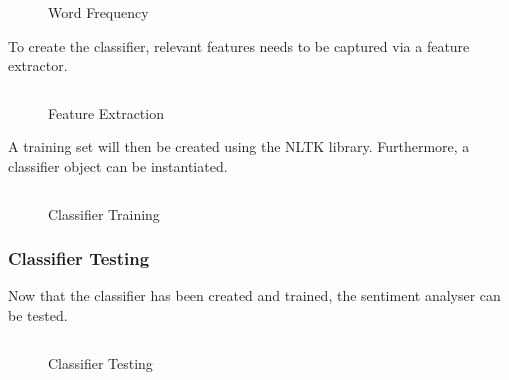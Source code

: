 \begin{figure}[h!]
  \centering
  \begin{minipage}{14cm}
    \centering
    \inputminted[fontsize=\footnotesize]{python}{inc/snippets/classifier.py}
    \caption{Word Frequency}
    \label{fig:sentiment_analysis_step2a}
  \end{minipage}
\end{figure}

To create the classifier, relevant features needs to be captured via a feature extractor.

\begin{figure}[h!]
  \centering
  \begin{minipage}{14cm}
    \centering
    \inputminted[fontsize=\footnotesize]{python}{inc/snippets/classifierB.py}
    \caption{Feature Extraction}
    \label{fig:sentiment_analysis_step2b}
  \end{minipage}
\end{figure}

A training set will then be created using the NLTK library. Furthermore, a classifier object can be instantiated.

\begin{figure}[h!]
  \centering
  \begin{minipage}{14cm}
    \centering
    \inputminted[fontsize=\footnotesize]{python}{inc/snippets/classifierC.py}
    \caption{Classifier Training}
    \label{fig:sentiment_analysis_step2b}
  \end{minipage}
\end{figure}

\subsubsection{Classifier Testing}

Now that the classifier has been created and trained, the sentiment analyser can be tested.

\begin{figure}[h!]
  \centering
  \begin{minipage}{14cm}
    \centering
    \inputminted[fontsize=\footnotesize]{python}{inc/snippets/classify.py}
    \caption{Classifier Testing}
    \label{fig:sentiment_analysis_step3}
  \end{minipage}
\end{figure}


